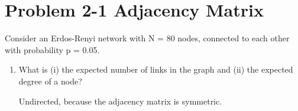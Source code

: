 \section{Problem 2-1 Adjacency Matrix}

Consider an Erdos-Renyi network with N = 80 nodes, connected to each other with probability p = 0.05.

\begin{enumerate}
	\item What is (i) the expected number of links in the graph and (ii) the expected degree of a node?
	
	Undirected, because the adjacency matrix is symmetric.
	
	
	
\end{enumerate}